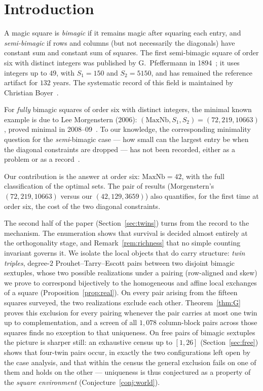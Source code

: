 \documentclass[11pt]{article}
\begin{document}
\section{Introduction}

A magic square is \emph{bimagic} if it remains magic after squaring each
entry, and \emph{semi-bimagic} if rows and columns (but not necessarily
the diagonals) have constant sum and constant sum of squares. The first
semi-bimagic square of order six with distinct integers was published by
G.~Pfeffermann in 1894~\cite{pfeffermann}; it uses integers up to $49$,
with $S_1=150$ and $S_2=5150$, and has remained the reference artifact
for $132$ years. The systematic record of this field is maintained by
Christian Boyer~\cite{multimagie}.

For \emph{fully} bimagic squares of order six with distinct integers,
the minimal known example is due to Lee Morgenstern (2006):
$(\mathrm{MaxNb},S_1,S_2)=(72,219,10663)$, proved minimal in
2008--09~\cite{multimagie}. To our knowledge, the corresponding minimality
question for the \emph{semi}-bimagic case --- how small can the largest
entry be when the diagonal constraints are dropped --- has not been
recorded, either as a problem or as a record~\cite{multimagie}.

Our contribution is the answer at order six:
$\mathrm{MaxNb}=42$, with the full classification of the optimal sets.
The pair of results (Morgenstern's $(72,219,10663)$ versus our
$(42,129,3659)$) also quantifies, for the first time at order six, the
cost of the two diagonal constraints.

The second half of the paper (Section~\ref{sec:twins}) turns from the
record to the mechanism. The enumeration shows that survival is
decided almost entirely at the orthogonality stage, and
Remark~\ref{rem:richness} that no simple counting invariant governs
it. We isolate the local objects that do carry structure: \emph{twin
triples}, degree-$2$ Prouhet--Tarry--Escott pairs between two disjoint
bimagic sextuples, whose two possible realizations under a pairing
(row-aligned and skew) we prove to correspond bijectively to the
homogeneous and affine local exchanges of a square
(Proposition~\ref{prop:real}). On every pair arising from the
fifteen squares surveyed, the two realizations exclude each other.
Theorem~\ref{thm:G} proves this exclusion for every pairing whenever
the pair carries at most one twin up to complementation, and a
screen of all $1{,}078$ column-block pairs across those squares
finds no exception to that uniqueness. On free pairs of bimagic
sextuples the picture is sharper still: an exhaustive census up to
$[1,26]$ (Section~\ref{sec:free}) shows that four-twin pairs occur,
in exactly the two configurations left open by the case analysis,
and that within the census the general exclusion fails on one of
them and holds on the other --- uniqueness is thus conjectured as a
property of the \emph{square environment}
(Conjecture~\ref{conj:world}).
\end{document}
